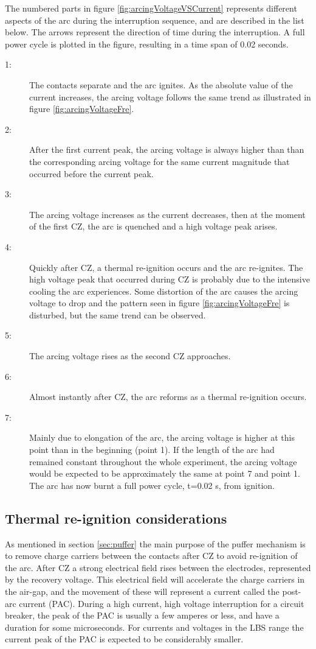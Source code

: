 \documentclass[10pt,b5paper,twoside]{article}
\begin{document}
The numbered parts in figure \ref{fig:arcingVoltageVSCurrent} represents different aspects of the arc during the interruption sequence, and are described in the list below. The arrows represent the direction of time during the interruption. A full power cycle is plotted in the figure, resulting in a time span of 0.02 seconds.
\begin{description}
\item[1:] The contacts separate and the arc ignites. As the absolute value of the current increases, the arcing voltage follows the same trend as illustrated in figure \ref{fig:arcingVoltageFre}.  
\item[2:] After the first current peak, the arcing voltage is always higher than than the corresponding arcing voltage for the same current magnitude that occurred before the current peak.
\item[3:] The arcing voltage increases as the current decreases, then at the moment of the first CZ, the arc is quenched and a high voltage peak arises.
\item[4:] Quickly after CZ, a thermal re-ignition occurs and the arc re-ignites. The high voltage peak that occurred during CZ is probably due to the intensive cooling the arc experiences. Some distortion of the arc causes the arcing voltage to drop and the pattern seen in figure \ref{fig:arcingVoltageFre} is disturbed, but the same trend can be observed.
\item[5:] The arcing voltage rises as the second CZ approaches.
\item[6:] Almost instantly after CZ, the arc reforms as a thermal re-ignition occurs.
\item[7:] Mainly due to elongation of the arc, the arcing voltage is higher at this point than in the beginning (point 1). If the length of the arc had remained constant throughout the whole experiment, the arcing voltage would be expected to be approximately the same at point 7 and point 1. The arc has now burnt a full power cycle, t=0.02 s, from ignition.
\end{description}

\subsection{Thermal re-ignition considerations}
As mentioned in section \ref{sec:puffer} the main purpose of the puffer mechanism is to remove charge carriers between the contacts after CZ to avoid re-ignition of the arc. After CZ a strong electrical field rises between the electrodes, represented by the recovery voltage. This electrical field will accelerate the charge carriers in the air-gap, and the movement of these will represent a current called the post-arc current (PAC). During a high current, high voltage interruption for a circuit breaker, the peak of the PAC is usually a few amperes or less, and have a duration for some microseconds. For currents and voltages in the LBS range the current peak of the PAC is expected to be considerably smaller.
\end{document}
